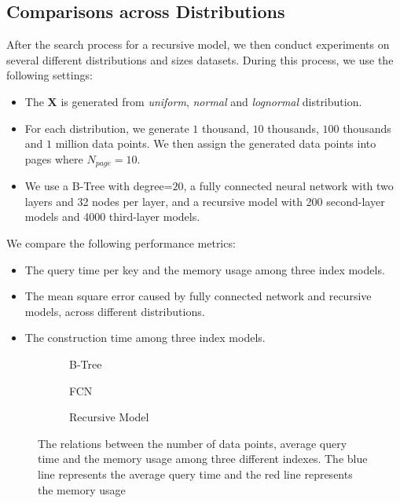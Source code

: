 \subsection{Comparisons across Distributions}

After the search process for a recursive model, we then conduct experiments on several different distributions and sizes datasets. During this process, we use the following settings:

\begin{itemize}
	\item The $\boldsymbol{X}$ is generated from \textit{uniform}, \textit{normal} and \textit{lognormal} distribution.
	\item For each distribution, we generate $1$ thousand, $10$ thousands, $100$ thousands and $1$ million data points. We then assign the generated data points into pages where $N_{page}=10$.
	\item We use a B-Tree with degree=$20$, a fully connected neural network with two layers and 32 nodes per layer, and a recursive model with 200 second-layer models and 4000 third-layer models.
\end{itemize}

We compare the following performance metrics:

\begin{itemize}
	\item The query time per key and the memory usage among three index models.
	\item The mean square error caused by fully connected network and recursive models, across different distributions.
	\item The construction time among three index models.
\end{itemize}

\begin{figure}
 \centering
     \begin{subfigure}[b]{0.28\textwidth}
         \centering
         
         \caption{B-Tree}
         \label{fig:exp2_1_btree}
     \end{subfigure}
     \hfill
     \begin{subfigure}[b]{0.28\textwidth}
         \centering
         
         \caption{FCN}
         \label{fig:exp2_1_fcn}
     \end{subfigure}
     \hfill
     \begin{subfigure}[b]{0.28\textwidth}
         \centering
         
         \caption{Recursive Model}
         \label{fig:exp2_1_rmi}
     \end{subfigure}
        \caption{The relations between the number of data points, average query time and the memory usage among three different indexes. The blue line represents the average query time and the red line represents the memory usage}
        \label{fig:exp2_1}
\end{figure}

